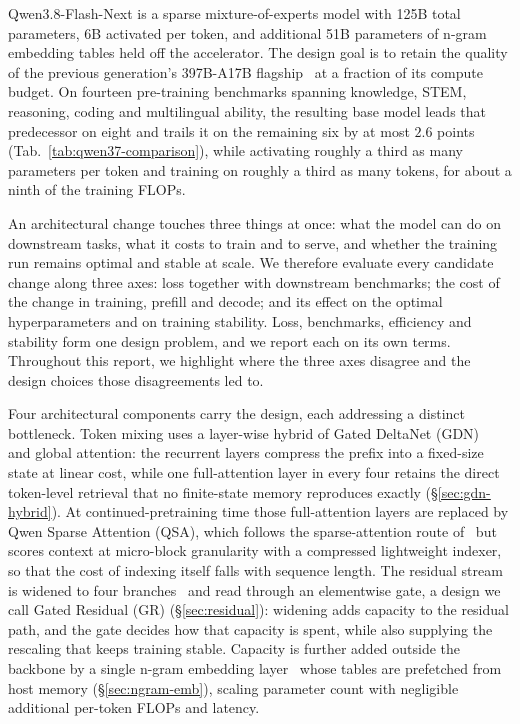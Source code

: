 
Qwen3.8-Flash-Next is a sparse mixture-of-experts model with 125B total parameters, 6B activated per token, and additional 51B parameters of n-gram embedding tables held off the accelerator.
The design goal is to retain the quality of the
previous generation's 397B-A17B flagship~\citep{qwenteam2026qwen35} at a fraction of its compute budget.
On fourteen pre-training benchmarks spanning knowledge, STEM, reasoning, coding and multilingual ability, the resulting base model leads that predecessor on eight and trails it on the remaining six by at most $2.6$ points (Tab.~\ref{tab:qwen37-comparison}), while activating roughly a third as many parameters per token and training on roughly a third as many tokens, for about a ninth of the training FLOPs.

An architectural change touches three things at once: what the model can do on downstream tasks, what it costs to train and to serve, and whether the training run remains optimal and stable at scale. 
We therefore evaluate every candidate
change along three axes: loss together with downstream benchmarks; 
the cost of the change in training, prefill and decode; and its effect on the optimal hyperparameters and on training stability. 
Loss, benchmarks, efficiency and stability form one design problem, and we report each on its own terms.
Throughout this report, we highlight where the three axes disagree and the design choices those disagreements led to.

Four architectural components carry the design, each addressing a distinct bottleneck. 
Token mixing uses a layer-wise hybrid of Gated
DeltaNet (GDN)~\citep{yang2024gated} and global attention: the recurrent layers compress the prefix into a fixed-size state at linear cost, while one full-attention layer in every four retains the direct token-level retrieval that no finite-state memory reproduces exactly (\S\ref{sec:gdn-hybrid}). 
At continued-pretraining time those full-attention layers are replaced by Qwen Sparse Attention (QSA), which follows the sparse-attention route of~\citet{liu2025deepseek} but scores context at micro-block granularity with a compressed lightweight indexer, so that the cost of indexing itself falls with sequence length. 
The residual stream is widened to four branches~\citep{baykal2023altup,zhu2024hyper} and read through an elementwise gate, a design we call Gated Residual (GR) (\S\ref{sec:residual}): widening adds capacity to the residual path, and the gate decides how that capacity is spent, while also supplying the rescaling that keeps training stable. 
Capacity is further added outside the backbone by a single n-gram embedding layer~\citep{google2025gemma3n,cheng2026engram} whose tables are prefetched from host memory (\S\ref{sec:ngram-emb}), scaling parameter count with negligible additional per-token FLOPs and latency.

